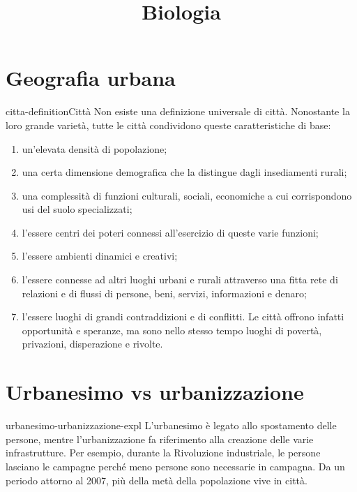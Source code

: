 \documentclass[preview]{standalone}
\begin{document}
\title{Biologia}
\genpage

\section{Geografia urbana}

\begin{snippetdefinition}{citta-definition}{Città}
    Non esiste una definizione universale di città.
    Nonostante la loro grande varietà, tutte le città condividono queste
    caratteristiche di base:
    \begin{enumerate}
        \item un'elevata densità di popolazione;
        \item una certa dimensione demografica che la distingue dagli
        insediamenti rurali;
        \item una complessità di funzioni culturali, sociali, economiche a cui
        corrispondono usi del suolo specializzati;
        \item l'essere centri dei poteri connessi all'esercizio di queste varie
        funzioni;
        \item l'essere ambienti dinamici e creativi;
        \item l'essere connesse ad altri luoghi urbani e rurali attraverso una
        fitta rete di relazioni e di flussi di persone, beni, servizi,
        informazioni e denaro;
        \item l'essere luoghi di grandi contraddizioni e di conflitti. Le città
        offrono infatti opportunità e speranze, ma sono nello stesso
        tempo luoghi di povertà, privazioni, disperazione e rivolte.
    \end{enumerate}
\end{snippetdefinition}

\section{Urbanesimo vs urbanizzazione}

\begin{snippet}{urbanesimo-urbanizzazione-expl}
    L'urbanesimo è legato allo spostamento delle persone,
    mentre l'urbanizzazione fa riferimento alla creazione delle varie infrastrutture.
    Per esempio, durante la Rivoluzione industriale, le persone lasciano le campagne
    perché meno persone sono necessarie in campagna.
    Da un periodo attorno al 2007, più della metà della popolazione vive in città.
\end{snippet}
\end{document}
